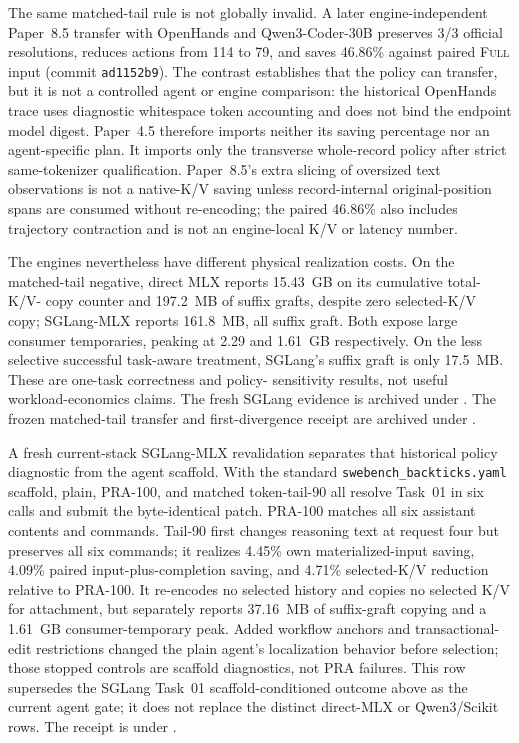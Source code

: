\documentclass[11pt]{article}
\begin{document}
The same matched-tail rule is not globally invalid.  A later engine-independent
Paper~8.5 transfer with OpenHands and Qwen3-Coder-30B preserves 3/3 official
resolutions, reduces actions from 114 to 79, and saves 46.86\% against paired
\textsc{Full} input (commit \texttt{ad1152b9}).  The contrast establishes
that the policy can transfer, but it is not a controlled agent or engine
comparison: the historical OpenHands trace uses diagnostic whitespace token
accounting and does not bind the endpoint model digest.  Paper~4.5 therefore
imports neither its saving percentage nor an agent-specific plan.  It imports
only the transverse whole-record policy after strict same-tokenizer
qualification.  Paper~8.5's extra slicing of oversized text observations is not
a native-K/V saving unless record-internal original-position spans are consumed
without re-encoding; the paired 46.86\% also includes trajectory contraction
and is not an engine-local K/V or latency number.

The engines nevertheless have different physical realization costs.  On the
matched-tail negative, direct MLX reports 15.43~GB on its cumulative total-K/V-
copy counter and 197.2~MB of suffix grafts, despite zero selected-K/V copy;
SGLang-MLX reports 161.8~MB, all suffix graft.  Both expose large consumer
temporaries, peaking at 2.29 and 1.61~GB respectively.  On the less selective
successful task-aware treatment, SGLang's suffix graft is only 17.5~MB.  These
are one-task correctness and policy-
sensitivity results, not useful workload-economics claims.  The fresh SGLang
evidence is archived under
.
The frozen matched-tail transfer and first-divergence receipt are archived under
.

A fresh current-stack SGLang-MLX revalidation separates that historical policy
diagnostic from the agent scaffold.  With the standard
\texttt{swebench\_backticks.yaml} scaffold, plain, PRA-100, and matched
token-tail-90 all resolve Task~01 in six calls and submit the byte-identical
patch.  PRA-100 matches all six assistant contents and commands.  Tail-90 first
changes reasoning text at request four but preserves all six commands; it
realizes 4.45\% own materialized-input saving, 4.09\% paired
input-plus-completion saving, and 4.71\% selected-K/V reduction relative to
PRA-100.  It re-encodes no selected history and copies no selected K/V for
attachment, but separately reports 37.16~MB of suffix-graft copying and a
1.61~GB consumer-temporary peak.  Added workflow anchors and transactional-edit
restrictions changed the plain agent's localization behavior before selection;
those stopped controls are scaffold diagnostics, not PRA failures.  This row
supersedes the SGLang Task~01 scaffold-conditioned outcome above as the current
agent gate; it does not replace the distinct direct-MLX or Qwen3/Scikit rows.
The receipt is under
.
\end{document}
